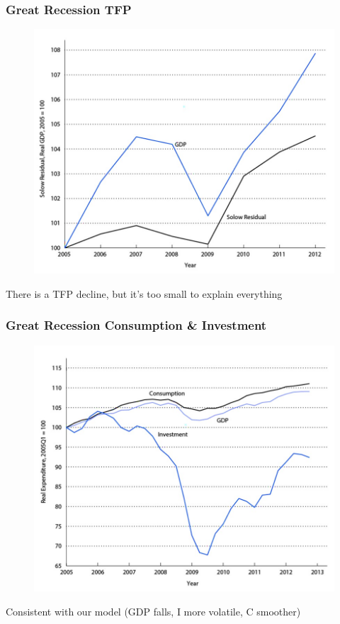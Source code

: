 \documentclass{beamer}
\begin{document}
\begin{frame}
\frametitle[alignment=center]{Great Recession TFP}
\begin{figure}
\centering
\includegraphics[scale=0.65]{Figures/W_Fig_13pt13.png}
\end{figure}
There is a TFP decline, but it's too small to explain everything
\end{frame}

\begin{frame}
\frametitle[alignment=center]{Great Recession Consumption \& Investment}
\begin{figure}
\centering
\includegraphics[scale=0.65]{Figures/W_Fig_13pt14.png}
\end{figure}
Consistent with our model (GDP falls, I more volatile, C smoother)
\end{frame}
\end{document}
